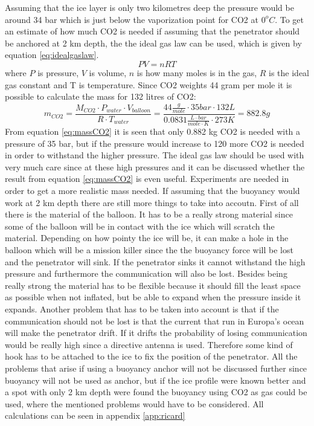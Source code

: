 \noindent
Assuming that the ice layer is only two kilometres deep the pressure would be around 34 bar which is just below the vaporization point for CO2 at $0^oC$. To get an estimate of how much CO2 is needed if assuming that the penetrator should be anchored at 2 km depth, the the ideal gas law can be used, which is given by equation \ref{eq:idealgaslaw}. 
\begin{equation} \label{eq:idealgaslaw}
PV = nRT
\end{equation}
where $P$ is pressure, $V$ is volume, $n$ is how many moles is in the gas, $R$ is the ideal gas constant and T is temperature. Since CO2 weights 44 gram per mole it is possible to calculate the mass for 132 litres of CO2: 
\begin{equation}\label{eq:massCO2}
m_{CO2} = \frac{M_{CO2} \cdot P_{water}\cdot V_{balloon}}{R\cdot T_{water}} = \frac{44 \frac{g}{mole} \cdot 35 bar \cdot 132 L}{0.0831  \frac{L\cdot bar}{mole \cdot K} \cdot 273K} = 882.8 g
\end{equation}
From equation \ref{eq:massCO2} it is seen that only 0.882 kg CO2 is needed with a pressure of 35 bar, but if the pressure would increase to 120 more CO2 is needed in order to withstand the higher pressure. The ideal gas law should be used with very much care since at these high pressures and it can be discussed whether the result from equation \ref{eq:massCO2} is even useful. Experiments are needed in order to get a more realistic mass needed. If assuming that the buoyancy would work at 2 km depth there are still more things to take into accoutn. First of all there is the material of the balloon. It has to be a really strong material since some of the balloon will be in contact with the ice which will scratch the material. Depending on how pointy the ice will be, it can make a hole in the balloon which will be a mission killer since the the buoyancy force will be lost and the penetrator will sink. If the penetrator sinks it cannot withstand the high pressure and furthermore the communication will also be lost. Besides being really strong the material has to be flexible because it should fill the least space as possible when not inflated, but be able to expand when the pressure inside it expands. Another problem that has to be taken into account is that if the communication should not be lost is that the current that run in Europa's ocean will make the penetrator drift. If it drifts the probability of losing communication would be really high since a directive antenna is used.  Therefore some kind of hook has to be attached to the ice to fix the position of the penetrator. All the problems that arise if using a buoyancy anchor will not be discussed further since buoyancy will not be used as anchor, but if the ice profile were known better and a spot with only 2 km depth were found the buoyancy using CO2 as gas could be used, where the mentioned problems would have to be considered. All calculations can be seen in appendix \ref{app:ricard}\\

